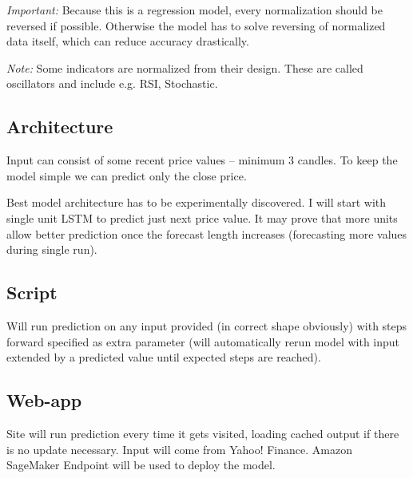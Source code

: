 \documentclass[a4paper,12pt]{article}
\begin{document}
\emph{Important:} Because this is a regression model, every normalization should be reversed if possible. Otherwise the model has to solve reversing of normalized data itself, which can reduce accuracy drastically.

\emph{Note:} Some indicators are normalized from their design. These are called oscillators and include e.g. RSI, Stochastic.

\subsection{Architecture}
Input can consist of some recent price values -- minimum 3 candles. To keep the model simple we can predict only the close price.

Best model architecture has to be experimentally discovered. I will start with single unit LSTM to predict just next price value. It may prove that more units allow better prediction once the forecast length increases (forecasting more values during single run).

\subsection{Script}
Will run prediction on any input provided (in correct shape obviously) with steps forward specified as extra parameter (will automatically rerun model with input extended by a predicted value until expected steps are reached).

\subsection{Web-app}
Site will run prediction every time it gets visited, loading cached output if there is no update necessary. Input will come from Yahoo! Finance. Amazon SageMaker Endpoint will be used to deploy the model.
\end{document}
